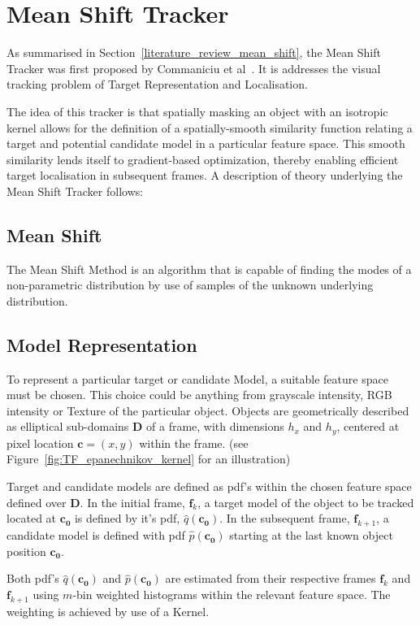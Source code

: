 \section{Mean Shift Tracker}\label{theoretical_framework_mean_shift_tracker}
As summarised in Section~\ref{literature_review_mean_shift}, the Mean Shift Tracker was
first proposed by Commaniciu et al~\cite{Comaniciu2003}. It is addresses the
visual tracking problem of Target Representation and Localisation.

The idea of this tracker is that spatially masking an object with an
isotropic kernel allows for the definition of a spatially-smooth similarity
function relating a target and potential candidate model in a particular feature
space. This smooth similarity lends itself to gradient-based optimization,
thereby enabling efficient target localisation in subsequent frames.
A description of theory underlying the Mean Shift Tracker follows:

\subsection{Mean Shift}\label{theoretical_framework_mean_shift}
The Mean Shift Method is an algorithm that is capable of finding the modes of a 
non-parametric distribution by use of samples of the unknown underlying distribution. 

\subsection{Model Representation}
To represent a particular target or candidate Model, a suitable feature space
must be chosen. This choice could be anything from grayscale intensity, RGB
intensity or Texture of the particular object. Objects are geometrically described 
as elliptical sub-domains $\mathbf{D}$ of a frame, with dimensions $h_x$ and
$h_y$, centered at pixel location $\mathbf{c}=(x,y)$ within the frame. (see
Figure~\ref{fig:TF_epanechnikov_kernel} for an illustration)

Target and candidate models are defined as pdf's within the chosen feature
space defined over $\mathbf{D}$. In the initial frame, $\mathbf{f}_k$, a target
model of the object to be tracked located at $\mathbf{c_0}$ is defined by it's
pdf, $\hat{q}(\mathbf{c_0})$. In the subsequent frame, $\mathbf{f}_{k+1}$, a
candidate model is defined with pdf $\hat{p}(\mathbf{c_0})$ starting at the last
known object position $\mathbf{c_0}$. 

Both pdf's $\hat{q}(\mathbf{c_0})$ and $\hat{p}(\mathbf{c_0})$ are estimated from
their respective frames $\mathbf{f}_k$ and $\mathbf{f}_{k+1}$ using $m$-bin
weighted histograms within the relevant feature space. The weighting is achieved
by use of a Kernel. 

